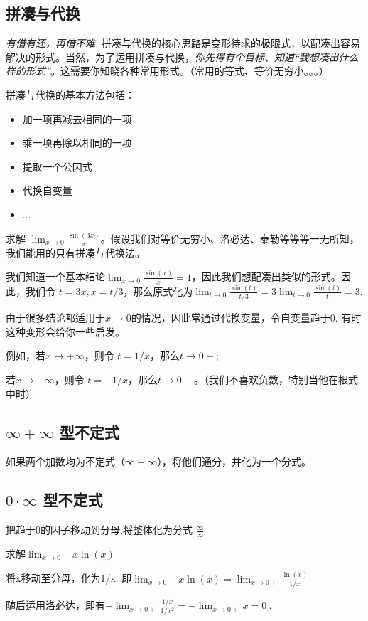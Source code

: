 \subsection{拼凑与代换}
\textsl{有借有还，再借不难.} 拼凑与代换的核心思路是变形待求的极限式，以配凑出容易解决的形式。当然，为了运用拼凑与代换，\textsl{你先得有个目标、知道“我想凑出什么样的形式”}。这需要你知晓各种常用形式。（常用的等式、等价无穷小。。。）

拼凑与代换的基本方法包括：
\begin{itemize}
\item 加一项再减去相同的一项
\item 乘一项再除以相同的一项
\item 提取一个公因式
\item 代换自变量
\item ...
\end{itemize}

\begin{example}{}
求解 $\lim_{x \to 0} \frac{\sin(3x)}{x}$。假设我们对等价无穷小、洛必达、泰勒等等等一无所知，我们能用的只有拼凑与代换法。

我们知道一个基本结论$\lim_{x \to 0} \frac{\sin(x)}{x}=1$，因此我们想配凑出类似的形式。因此，我们令 $t=3x, x=t/3$，那么原式化为$\lim_{t \to 0} \frac{\sin(t)}{t/3}=3\lim_{t \to 0} \frac{\sin(t)}{t}=3$.
\end{example}

\begin{example}{}
由于很多结论都适用于$x\to0$的情况，因此常通过代换变量，令自变量趋于0. 有时这种变形会给你一些启发。

例如，若$x\to+\infty$，则令 $t=1/x$，那么$t\to0+$; 

若$x\to-\infty$，则令 $t=-1/x$，那么$t\to0+$。（我们不喜欢负数，特别当他在根式中时）
\end{example}

\subsection{$\infty+\infty$ 型不定式}
如果两个加数均为不定式（$\infty+\infty$），将他们通分，并化为一个分式。

\subsection{$0\cdot\infty$ 型不定式}
把趋于0的因子移动到分母,将整体化为分式 $\frac{\infty}{\infty}$
\begin{example}{}
求解$\lim_{x\to0+} x\ln(x)$

将x移动至分母，化为1/x. 即$\lim_{x\to0+} x\ln(x)=\lim_{x\to0+} \frac{\ln(x)}{1/x}$

随后运用洛必达，即有$-\lim_{x\to0+} \frac{1/x}{1/x^2}=-\lim_{x\to0+} x=0~.$
\end{example}


